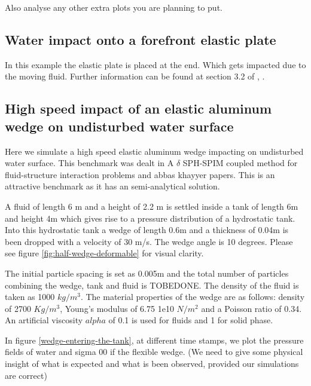\documentclass[preprint,12pt]{elsarticle}
\begin{document}
Also analyse any other extra plots you are planning to put.



\subsection{Water impact onto a forefront elastic plate}
\label{sec:water-impact-forefront}

In this example the elastic plate is placed at the end. Which gets
impacted due to the moving fluid. Further information can be found at
section 3.2 of \cite{liu2013numerical}, \citet{sun2019fully}.




\subsection{High speed impact of an elastic aluminum wedge on undisturbed
  water surface}
\label{sec:wedge-impact-on-water}

Here we simulate a high speed elastic aluminum wedge impacting on undisturbed
water surface. This benchmark was dealt in
{A $\delta$ SPH-SPIM coupled method for fluid-structure interaction problems} and
{abbas khayyer} papers.
This is an attractive benchmark as it has an semi-analytical solution.

A fluid of length 6 m and a height of 2.2 m is settled inside a tank of length
6m and height 4m which gives rise to a pressure distribution of a hydrostatic
tank. Into this hydrostatic tank a wedge of length 0.6m and a thickness of
0.04m is been dropped with a velocity of 30 m/s. The wedge angle is 10
degrees. Please see figure \ref{fig:half-wedge-deformable} for visual clarity.

The initial particle spacing is set as 0.005m and the total number of
particles combining the wedge, tank and fluid is TOBEDONE. The density of the
fluid is taken as 1000 $kg/m^3$. The material properties of the wedge are as
follows: density of 2700 $Kg/m^3$, Young's modulus of 6.75 1e10 $N/m^2$ and a
Poisson ratio of 0.34. An artificial viscosity $alpha$ of 0.1 is used for
fluids and 1 for solid phase.

In figure \ref{wedge-entering-the-tank}, at different time stamps, we plot the
pressure fields of water and sigma 00 if the flexible wedge. (We need to give
some physical insight of what is expected and what is been observed, provided
our simulations are correct)
\end{document}
